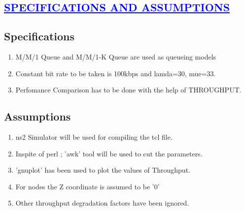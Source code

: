 \documentclass[a4paper,12pt]{report}
\begin{document}
\begin{center}
\chapter{\textcolor{blue}{\underline {SPECIFICATIONS AND ASSUMPTIONS}}}
\end{center}
\section*{Specifications}
\begin{enumerate}
 

 \item M/M/1 Queue and M/M/1-K Queue are used as queueing models
 \item Constant bit rate to be taken is 100kbps and lamda=30, mue=33.
 \item Perfomance Comparison has to be done with the help of THROUGHPUT.
\end{enumerate}

\section*{Assumptions}
\begin{enumerate}
\item ns2 Simulator will be used for compiling the tcl file.
\item Inspite of perl ; 'awk' tool will be used to cut the parameters.
\item 'gnuplot' has been used to plot the values of Throughput.
\item For nodes the Z coordinate is assumed to be '0'
\item Other throughput degradation factors have been ignored.
\end{enumerate}
 
\end{document}
